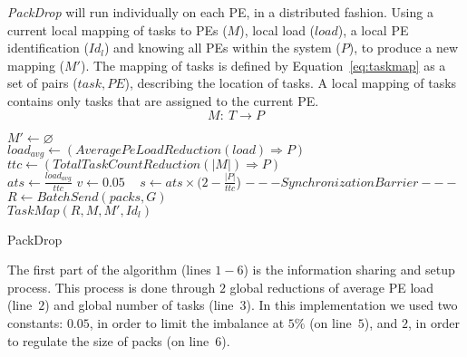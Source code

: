 \textit{PackDrop} will run individually on each PE, in a distributed fashion. 
Using a current local mapping of tasks to PEs ($M$), local load ($load$), a local PE identification ($Id_l$) and knowing all PEs within the system ($P$), to produce a new mapping ($M'$).
The mapping of tasks is defined by Equation~\ref{eq:taskmap} as a set of pairs ($task, PE$), describing the location of tasks.
A local mapping of tasks contains only tasks that are assigned to the current PE.
\begin{equation}
	M:\ T \rightarrow P
	\label{eq:taskmap}
\end{equation}
\vspace{-20pt}
\begin{algorithm}[ht]
	\DontPrintSemicolon
    $  M' \gets \varnothing$\\
    $load_{avg} \gets (AveragePeLoadReduction(load)\Rightarrow  P)$ \\
    $ttc \gets (TotalTaskCountReduction(|M|)\Rightarrow  P)$\\
    $ats\gets \frac{load_{avg}}{ttc}$ \qquad\qquad\qquad {}
    $v \gets 0.05$ \qquad \qquad\ 
    $s \gets ats\times (2-\frac{|  P|}{ttc}$) \qquad\qquad\qquad\qquad {}
    $---Synchronization Barrier---$\\
    $R \gets BatchSend(packs, G)$\\
    $TaskMap(R,M, M',Id_{l})$
    \caption{PackDrop}
    \label{alg::packdrop}    
\end{algorithm}

The first part of the algorithm (lines $1-6$) is the information sharing and setup process. 
This process is done through $2$ global reductions of average PE load (line~$2$) and global number of tasks (line~$3$).
In this implementation we used two constants: $0.05$, in order to limit the imbalance at $5\%$ (on line~$5$), and $2$, in order to regulate the size of packs (on line~$6$).

